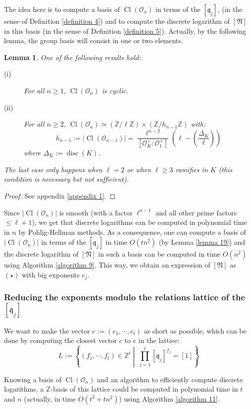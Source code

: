 \documentclass[a4paper,10pt]{report}
\theoremstyle{definition}
\theoremstyle{plain}
\newtheorem{lemma}[definition]{Lemma}
\theoremstyle{definition}
\newcommand{\Z}{\mathbb{Z}}
\newcommand{\mO}{\mathcal{O}}
\renewcommand{\(}{\left(}
\renewcommand{\)}{\right)}
\newcommand{\mf}[1]{\mathfrak{#1}}
\DeclareMathOperator{\disc}{disc}
\DeclareMathOperator{\Cl}{Cl}
\begin{document}
The idea here is to compute a basis of $\Cl(\mO_n)$ in terms of the $[\mf{q}_j]$, (in the sense of Definition \ref{definition 4}) and to compute the discrete logarithm of $[\mf{N}]$ in this basis (in the sense of Definition \ref{definition 5}). Actually, by the following lemma, the group basis will consist in one or two elements.

\begin{lemma}\label{lemma 20}
One of the following results hold:

\begin{description}
\item[(i)] For all $n\geq 1$, $\Cl(\mO_n)$ is cyclic.
\item[(ii)] For all $n\geq 2$, $\Cl(\mO_n)\simeq (\Z/\ell\Z)\times(\Z/h_{n-1}\Z)$ with:
\[h_{n-1}:=|\Cl(\mO_{n-1})|=\frac{\ell^{n-2}}{[\mO_K^\times:\mO_1^\times]}\(\ell-\(\frac{\Delta_K}{\ell}\)\)\]
where $\Delta_K:=\disc(K)$.
\end{description}
The last case only happens when $\ell=2$ or when $\ell\geq 3$ ramifies in $K$ (this condition is necessary but not sufficient). 
\end{lemma} 

\begin{proof}
See appendix \ref{appendix 1}.
\end{proof}

Since $|\Cl(\mO_n)|$ is smooth (with a factor $\ell^{n-1}$ and all other prime factors $\leq \ell+1$), we get that discrete logarithms can be computed in polynomial time in $n$ by Pohlig-Hellman methods. As a consequence, one can compute a basis of $|\Cl(\mO_n)|$ in terms of the $[\mf{q}_j]$ in time $O(tn^2)$ (by Lemma \ref{lemma 19}) and the discrete logarithm of $[\mf{N}]$ in such a basis can be computed in time $O(n^2)$ using Algorithm \ref{algorithm 9}. This way, we obtain an expression of $[\mf{N}]$ as $(\star)$ with big exponents $e_j$.


\subsubsection{Reducing the exponents modulo the relations lattice of the $[\mf{q}_j]$}\label{paragraph 16}

We want to make the vector $e:=(e_1, \cdots, e_t)$ as short as possible, which can be done by computing the closest vector $c$ to $e$ in the lattice:
\[L:=\left\{(f_1,\cdots,f_{t})\in\Z^{t} \middle| \  \prod_{j=1}^t[\mf{q}_j]^{f_j}=[1]\right\}\]

Knowing a basis of $\Cl(\mO_n)$ and an algorithm to efficiently compute discrete logarithms, a $\Z$-basis of this lattice could be computed in polynomial time in $t$ and $n$ (actually, in time $O(t^3+tn^2)$) using Algorithm \ref{algorithm 11}.
\end{document}

